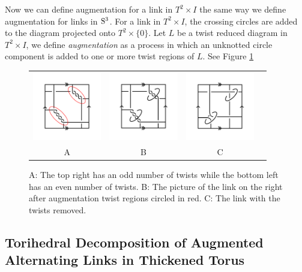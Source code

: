 \documentclass[11pt]{amsart}
\newcommand{\Sp}{\rm{S}}
\theoremstyle{plain}
\theoremstyle{definition}
\begin{document}
Now we can define augmentation for a link in $T^2 \times I$ the same way we define augmentation for links in $\Sp^3$. For a link in $T^2 \times I$, the crossing circles are added to the diagram projected onto $T^2 \times \{0\}$. Let $L$ be a twist reduced diagram in $T^2 \times I$, we define {\it augmentation} as a process in which an unknotted circle component is added to one or more twist regions of $L$. See Figure \ref{fig:Augmentations}


 \begin{figure}
 \centering
 \begin{tabular}{cccc}
 \includegraphics [width=3cm]{fig1}&
 \includegraphics  [width=3cm]{twist-augment}&
  \includegraphics [width=3cm]{fig-2}\\
  A&B&C
  \end{tabular}
 \caption{A: The top right has an odd number of twists while the bottom left has an even number of twists. B: The picture of the link on the right after augmentation twist regions circled in red. C: The link with the twists removed.}
 \label{fig:Augmentations}
 \end{figure}

\subsection{Torihedral Decomposition of Augmented Alternating Links in Thickened Torus}
\end{document}
